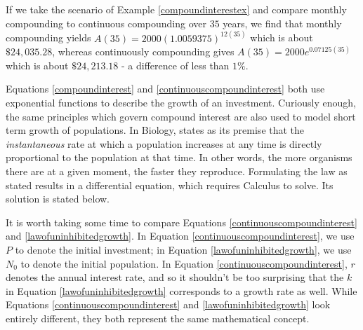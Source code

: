 \smallskip

If we take the scenario of Example \ref{compoundinterestex} and compare monthly compounding to continuous compounding over $35$ years, we find that monthly compounding yields $A(35) = 2000 (1.0059375)^{12(35)}$ which is about  $\$ 24,\!035.28$, whereas continuously compounding gives $A(35) = 2000e^{0.07125 (35)}$ which is about  $\$ 24,\!213.18$ - a difference of less than $1 \%$.

\smallskip

Equations \ref{compoundinterest} and \ref{continuouscompoundinterest} both use exponential functions to describe the growth of an investment.  Curiously enough, the same principles which govern compound interest are also used to model short term growth of populations.  In Biology,  states as its premise that the \textit{instantaneous}   rate at which a population increases at any time is directly proportional to the population at that time.  In other words, the more organisms there are at a given moment, the faster they reproduce.  Formulating the law as stated results in a differential equation, which requires Calculus to solve.  Its solution is stated below.


\smallskip


\smallskip 

 It is worth taking some time to compare Equations \ref{continuouscompoundinterest} and \ref{lawofuninhibitedgrowth}.  In  Equation \ref{continuouscompoundinterest}, we use $P$ to denote the initial investment;  in Equation \ref{lawofuninhibitedgrowth}, we use $N_{0}$ to denote the initial population.  In  Equation \ref{continuouscompoundinterest}, $r$ denotes the annual interest rate,  and so it shouldn't be too surprising that the $k$ in Equation \ref{lawofuninhibitedgrowth} corresponds to a growth rate as well.   While Equations \ref{continuouscompoundinterest} and \ref{lawofuninhibitedgrowth} look entirely different, they both represent the same mathematical concept.

